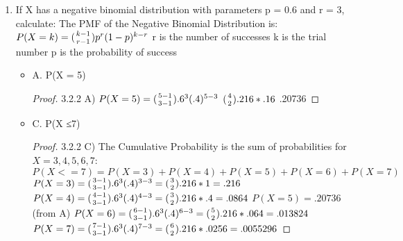 \documentclass{article}
\begin{document}
\begin{enumerate}
\begin{itemize}
\begin{proof}
$.99757+.001701+.0005103 = .9997813$

$P(X>=8) = 1-.9997813 $
$.0002187$
\end{proof}
                \end{itemize}
		
		\item  If X has a negative binomial distribution with parameters p = 0.6 and r = 3, calculate:
The PMF of the Negative Binomial Distribution is:
$P(X=k)= ({k-1 \atop r-1})p^{r}(1-p)^{k-r}$
r is the number of successes
k is the trial number
p is the probability of success
              \begin{itemize}
                  \item A. P(X = 5)
\begin{proof}
3.2.2 A)
$P(X=5)= ({5-1 \atop 3-1}).6^{3}(.4)^{5-3}$
$({4 \atop 2}).216*.16$
.20736
\end{proof}
                  \item C. P(X ≤7)
\begin{proof}
3.2.2 C)
The Cumulative Probability is the sum of probabilities for 
$X = 3,4,5,6,7$:
$P(X<=7) = P(X=3)+P(X=4)+P(X=5)+P(X=6)+P(X=7)$
$ P(X=3) =  ({3-1 \atop 3-1}).6^{3}(.4)^{3-3}=({3 \atop 2}).216*1 = .216$
$P(X=4) = ({4-1 \atop 3-1}).6^{3}(.4)^{4-3}=({3 \atop 2}).216*.4 =  .0864$
$P(X=5) = .20736$ (from A)
$P(X=6) = ({6-1 \atop 3-1}).6^{3}(.4)^{6-3}=({5 \atop 2}).216*.064 = .013824$
$P(X=7) =  ({7-1 \atop 3-1}).6^{3}(.4)^{7-3}=({6 \atop 2}).216*.0256 = .0055296$


\end{proof}
\end{itemize}
\end{enumerate}
\end{document}
